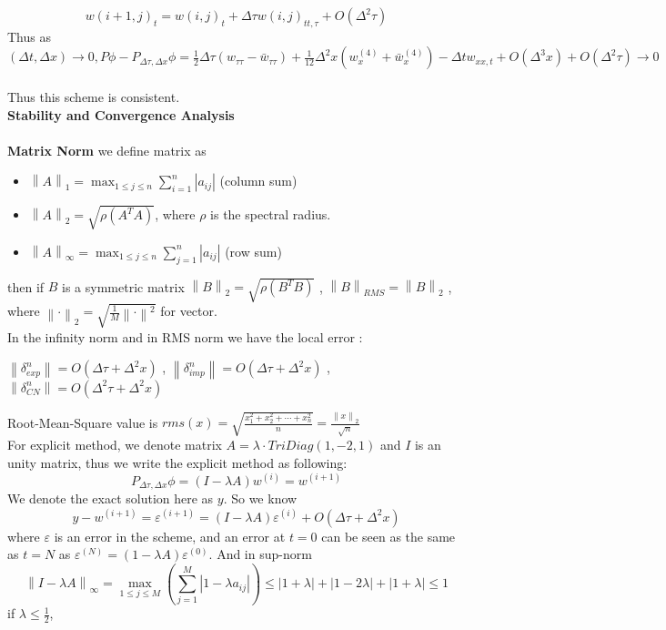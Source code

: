 \documentclass{article}
\begin{document}
$$
w(i+1,j)_{t} = w(i, j)_t + \Delta \tau w(i, j)_{tt, \tau} + O(\Delta^2 \tau)
$$
Thus as $(\Delta t , \Delta x) \rightarrow 0, P\phi - P_{\Delta \tau, \Delta x}\phi =  \frac{1}{2}\Delta \tau (w_{\tau \tau}-\bar{w}_{\tau \tau}) + \frac{1}{12}\Delta^2 x (w^{(4)}_x+\bar{w}^{(4)}_x) - \Delta t w_{xx,t}+ O(\Delta^3 x) + O(\Delta^2 \tau)\rightarrow 0$\\\\
Thus this scheme is consistent.\\
\textbf{Stability and Convergence Analysis}\\\\
\textbf{Matrix Norm} we define matrix as 
\begin{itemize}
\item $\left \| A \right \|_1 = \max_{1 \leq j \leq n}\sum_{i = 1}^n |a_{ij}|$ (column sum)
\item $\left \| A \right \|_2 = \sqrt{\rho(A^T A)}$, where $\rho$ is the spectral radius.
\item $\left \| A \right \|_{\infty} = \max_{1 \leq j \leq n}\sum_{j = 1}^{n} |a_{ij}|$ (row sum)
\end{itemize}
then if $B$ is a symmetric matrix $\left \| B \right \|_2 = \sqrt{\rho(B^T B)}$ , $\left \| B \right \|_{RMS} = \left \| B \right \|_2$ , where $\left \| \cdot \right \|_2 = \sqrt{\frac{1}{M}{\left \| \cdot \right \|}^2} $ for vector.\\
In the infinity norm and in RMS norm we have the local error : 
\begin{center}
$\left \| \delta_{exp}^n \right \| = O(\Delta \tau+\Delta^2 x)$ , $ \left \| \delta_{imp}^n \right \| = O(\Delta \tau+\Delta^2 x)$ , $\left \| \delta_{CN}^n \right \| = O(\Delta^2 \tau+\Delta^2 x)$
\end{center}
Root-Mean-Square value is $rms(x) = \sqrt{\frac{x_1^2 + x_2^2 + \cdots + x_n^2}{n}} = \frac{\left \| x \right \|_2}{\sqrt{n}}$\\
For explicit method, we denote matrix $A = \lambda \cdot TriDiag(1,-2,1)$ and $I$ is an unity matrix, thus we write the explicit method as following:
$$
P_{\Delta \tau, \Delta x}\phi = (I - \lambda A)w^{(i)} = w^{(i+1)}
$$
We denote the exact solution here as $y$. So we know
$$
y - w^{(i+1)} = \varepsilon^{(i+1)} = (I - \lambda A)\varepsilon^{(i)} + O(\Delta \tau +\Delta^2 x) 
$$
where $\varepsilon$ is an error in the scheme, and an error at $t = 0$ can be seen as the same as $t = N$ as $\varepsilon^{(N)} = (1 - \lambda A)\varepsilon^{(0)}$.	And in sup-norm
$$
\left \| I - \lambda A \right \|_{\infty} = \max_{1 \leq j \leq M}(\sum_{j=1}^{M}|1 - \lambda a_{ij}|) \leq |1+\lambda| + |1 - 2\lambda| + |1 + \lambda| \leq 1 
$$if $\lambda \leq \frac{1}{2}$,\\
\end{document}
